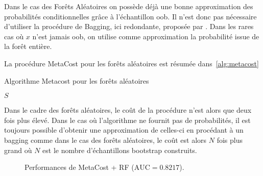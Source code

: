 Dans le cas des Forêts Aléatoires on possède déjà une bonne approximation des probabilités conditionnelles grâce à l'échantillon \ac{oob}. Il n'est donc pas nécessaire d'utiliser la procédure de Bagging, ici redondante, proposée par \citet{PedroD}. Dans les rares cas où $x$ n'est jamais \ac{oob}, on utilise comme approximation la probabilité issue de la forêt entière.

La procédure MetaCost pour les forêts aléatoires est résumée dans~\ref{alg:metacost}

\begin{algorithm}
\caption{Algorithme Metacost pour les forêts aléatoires}\label{alg:metacost}
\begin{algorithmic}
    
    
            \Else {}
            \EndIf
        \EndFor
    \EndFor
    \State \Return $S$
    \EndProcedure
\end{algorithmic}    
\end{algorithm}

Dans le cadre des forêts aléatoires, le coût de la procédure n'est alors que deux fois plus élevé. Dans le cas où l'algorithme ne fournit pas de probabilités, il est toujours possible d'obtenir une approximation de celles-ci en procédant à un bagging comme dans le cas des forêts aléatoires, le coût est alors $N$ fois plus grand où $N$ est le nombre d'échantillons bootstrap construits.

\begin{figure}[htbp]
    \caption{Performances de MetaCost + RF ($\mathrm{AUC} = 0.8217$).}
\end{figure}